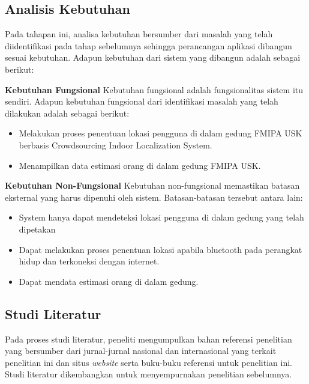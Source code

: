 \subsection{Analisis Kebutuhan}
Pada tahapan ini, analisa kebutuhan bersumber dari masalah yang telah diidentifikasi pada tahap sebelumnya sehingga perancangan aplikasi dibangun sesuai kebutuhan. Adapun kebutuhan dari sistem yang dibangun adalah sebagai berikut:

\par \textbf{Kebutuhan Fungsional} Kebutuhan fungsional adalah fungsionalitas sistem itu sendiri. Adapun kebutuhan fungsional dari identifikasi masalah yang telah dilakukan adalah sebagai berikut:

\begin{itemize}
	\item Melakukan proses penentuan lokasi pengguna di dalam gedung FMIPA USK berbasis Crowdsourcing Indoor Localization System.

	\item Menampilkan data estimasi orang di dalam gedung FMIPA USK.

\end{itemize}

\par \textbf{Kebutuhan Non-Fungsional} Kebutuhan non-fungsional memastikan batasan eksternal yang harus dipenuhi oleh sistem. Batasan-batasan tersebut antara lain:
\begin{itemize}
	\item System hanya dapat mendeteksi lokasi pengguna di dalam gedung yang telah dipetakan

	\item Dapat melakukan proses penentuan lokasi apabila bluetooth pada perangkat hidup dan terkoneksi dengan internet.

	\item Dapat mendata estimasi orang di dalam gedung.

\end{itemize}



\subsection{Studi Literatur}
Pada proses studi literatur, peneliti mengumpulkan bahan referensi penelitian yang bersumber dari jurnal-jurnal nasional dan internasional yang terkait penelitian ini dan situs \textit{website} serta buku-buku referensi untuk penelitian ini. Studi literatur dikembangkan untuk menyempurnakan penelitian sebelumnya.

